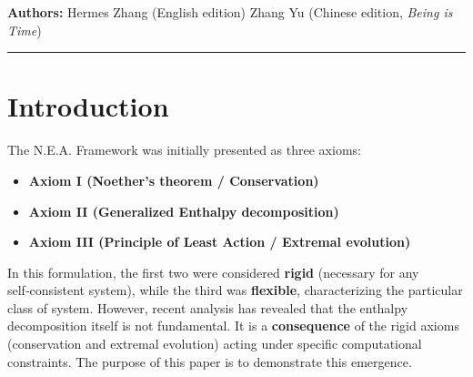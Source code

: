 \documentclass{article}
\begin{document}
\textbf{Authors:} Hermes Zhang (English edition) \quad Zhang Yu (Chinese edition, \textit{Being is Time})

\vspace{0.5cm}
\noindent\rule{\textwidth}{0.4pt}
\vspace{0.5cm}

\begin{abstract}
The N.E.A. Framework was originally proposed as three axioms: Noether’s theorem (conservation), generalized enthalpy (decomposition), and the principle of least action (extremal evolution). In this paper we show that the enthalpy decomposition is not an independent axiom but \textbf{emerges} from the two rigid axioms—\textbf{Noether’s theorem and the principle of least action}—under the specific computational constraints of a given system. These constraints include the dimensionality of the underlying network, the information‑processing bandwidth of nodes, and the linearity of interactions. We derive two paradigmatic cases: (i) in a sparse, three‑dimensional, linear network, the rigid axioms force the linear enthalpy form $Q = U + pV$, which underlies physical spacetime, gravity, and gauge groups; (ii) in an economic system where nodes (humans) have finite information‑processing bandwidth, the same rigid axioms produce a logarithmic enthalpy form $Q = k N \ln I + p E(N)$, with $E(N) \propto N$ in a three‑dimensional transaction network, which suggests a mechanism for the Pareto (power‑law) distribution of wealth. The framework thus unifies physics, economics, and complex systems under a single variational principle, showing that all observable macroscopic regularities are consequences of \textbf{Noether’s theorem and the principle of least action} acting within specific constraint landscapes. No independent “flexible axiom” is required; all phenomenological laws are emergent.
\end{abstract}

\section{Introduction}
The N.E.A. Framework was initially presented as three axioms:
\begin{itemize}
    \item \textbf{Axiom I (Noether’s theorem / Conservation)}
    \item \textbf{Axiom II (Generalized Enthalpy decomposition)}
    \item \textbf{Axiom III (Principle of Least Action / Extremal evolution)}
\end{itemize}
In this formulation, the first two were considered \textbf{rigid} (necessary for any self‑consistent system), while the third was \textbf{flexible}, characterizing the particular class of system. However, recent analysis has revealed that the enthalpy decomposition itself is not fundamental. It is a \textbf{consequence} of the rigid axioms (conservation and extremal evolution) acting under specific computational constraints. The purpose of this paper is to demonstrate this emergence.
\end{document}
